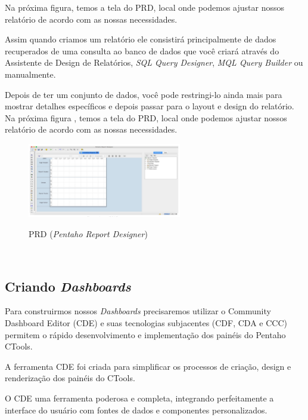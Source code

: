 Na  pr\'oxima figura, temos a tela do PRD, local onde podemos ajustar nossos relat\'orio de acordo com as nossas
necessidades.

Assim quando criamos um relat\'orio ele consistir\'{a} principalmente de dados recuperados de uma consulta ao banco de dados que você criar\'{a} atrav\'{e}s do Assistente de Design de Relat\'orios, \textit{SQL Query Designer}, \textit{MQL Query Builder} ou manualmente. 

Depois de ter um conjunto de dados, você pode restringi-lo ainda mais para mostrar detalhes espec\'{i}ficos e depois passar para o layout e design do relat\'orio. Na pr\'oxima figura , temos a tela do PRD, local onde podemos ajustar nossos relat\'orio de acordo com as nossas necessidades.

\begin{figure}[H]
	\vspace*{0,2cm}
    \centering
    \caption{PRD (\textit{Pentaho Report Designer})}
    \includegraphics[width=0.6\textwidth]{./04-figuras/figura-pentaho-prd}
    \label{fig:ilustfigpentahoprd}
\end{figure}
\vspace*{-0,9cm}
{\raggedright {}} \\

\subsection{Criando \textit{Dashboards}}

Para construirmos nossos \textit{Dashboards} precisaremos utilizar o  Community Dashboard Editor (CDE) e suas tecnologias subjacentes (CDF, CDA e CCC) permitem o r\'{a}pido desenvolvimento e implementa\c{c}\~{a}o dos pain\'{e}is do Pentaho CTools. 

A ferramenta CDE foi criada para simplificar os processos de cria\c{c}\~{a}o, design e renderiza\c{c}\~{a}o dos pain\'{e}is do CTools.

O CDE uma ferramenta poderosa e completa, integrando perfeitamente a interface do usu\'{a}rio com fontes de dados e componentes personalizados.

